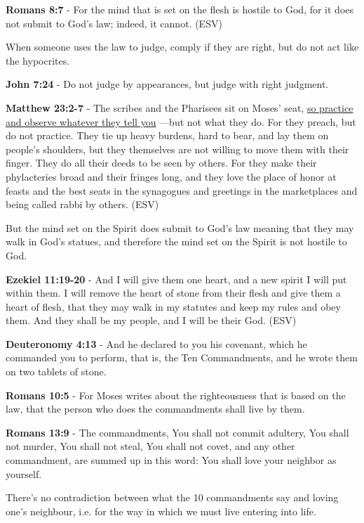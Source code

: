 \documentclass[11pt]{article}
\begin{document}
\textbf{Romans 8:7} - For the mind that is set on the flesh is hostile to God, for it does not submit to God's law; indeed, it cannot. (ESV)

When someone uses the law to judge, comply if they are right, but do not act like the hypocrites.

\textbf{John 7:24} - Do not judge by appearances, but judge with right judgment.

\textbf{Matthew 23:2-7} - The scribes and the Pharisees sit on Moses' seat, \uline{so practice and observe whatever they tell you} —but not what they do. For they preach, but do not practice. They tie up heavy burdens, hard to bear, and lay them on people's shoulders, but they themselves are not willing to move them with their finger. They do all their deeds to be seen by others. For they make their phylacteries broad and their fringes long, and they love the place of honor at feasts and the best seats in the synagogues and greetings in the marketplaces and being called rabbi by others. (ESV)

But the mind set on the Spirit does submit to God's law meaning that they may walk in God's statues, and therefore the mind set on the Spirit is not hostile to God.

\textbf{Ezekiel 11:19-20} - And I will give them one heart, and a new spirit I will put within them. I will remove the heart of stone from their flesh and give them a heart of flesh, that they may walk in my statutes and keep my rules and obey them. And they shall be my people, and I will be their God. (ESV)

\textbf{Deuteronomy 4:13} - And he declared to you his covenant, which he commanded you to perform, that is, the Ten Commandments, and he wrote them on two tablets of stone.

\textbf{Romans 10:5} - For Moses writes about the righteousness that is based on the law, that the person who does the commandments shall live by them.

\textbf{Romans 13:9} - The commandments, You shall not commit adultery, You shall not murder, You shall not steal, You shall not covet, and any other commandment, are summed up in this word: You shall love your neighbor as yourself.

There's no contradiction between what the 10 commandments say and loving one's neighbour, i.e. for the way in which we must live entering into life.
\end{document}
